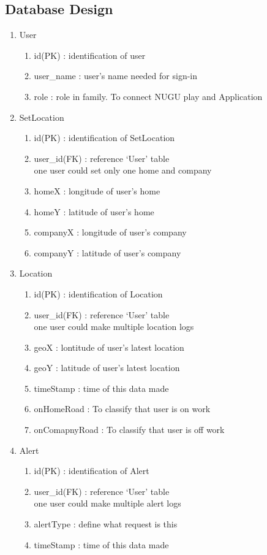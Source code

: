 \documentclass[conference]{IEEEtran}
\begin{document}
\subsection{Database Design}
\begin{enumerate}
    \item User
    \begin{enumerate}
        \item id(PK) : identification of user
        \item user\_name : user’s name needed for sign-in
        \item role : role in family. To connect NUGU play and Application
    \end{enumerate}
    
    \item SetLocation
    \begin{enumerate}
        \item id(PK) : identification of SetLocation
        \item user\_id(FK) : reference ‘User’ table\\
        one user could set only one home and company
        \item homeX : longitude of user’s home
        \item homeY : latitude of user’s home
        \item companyX : longitude of user’s company
        \item companyY : latitude of user’s company
    \end{enumerate}
     
    \item Location
    \begin{enumerate}
        \item id(PK) : identification of Location
        \item user\_id(FK) : reference ‘User’ table\\
        one user could make multiple location logs
        \item geoX : lontitude of user’s latest location
        \item geoY : latitude of user’s latest location
        \item timeStamp : time of this data made
        \item onHomeRoad : To classify that user is on work
        \item onComapnyRoad : To classify that user is off work
    \end{enumerate}
    
    \item Alert
    \begin{enumerate}
        \item id(PK) : identification of Alert
        \item user\_id(FK) : reference ‘User’ table\\
	    one user could make multiple alert logs
	    \item alertType : define what request is this
	    \item timeStamp : time of this data made\\
    \end{enumerate}
\end{enumerate}
\end{document}
